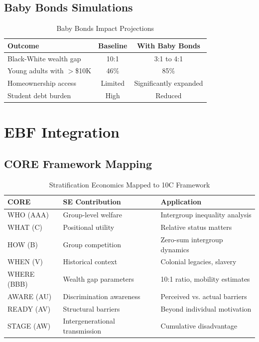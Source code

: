 \subsection{Baby Bonds Simulations}

\begin{table}[htbp]
\centering
\caption{Baby Bonds Impact Projections}
\label{tab:se-baby-bonds}
\begin{tabular}{lcc}
\toprule
\textbf{Outcome} & \textbf{Baseline} & \textbf{With Baby Bonds} \\
\midrule
Black-White wealth gap & 10:1 & 3:1 to 4:1 \\
Young adults with $>$\$10K & 46\% & 85\% \\
Homeownership access & Limited & Significantly expanded \\
Student debt burden & High & Reduced \\
\bottomrule
\end{tabular}
\end{table}

\section{EBF Integration}
\label{sec:se-integration}

\subsection{CORE Framework Mapping}

\begin{table}[htbp]
\centering
\caption{Stratification Economics Mapped to 10C Framework}
\label{tab:se-9c-mapping}
\begin{tabular}{lll}
\toprule
\textbf{CORE} & \textbf{SE Contribution} & \textbf{Application} \\
\midrule
WHO (AAA) & Group-level welfare & Intergroup inequality analysis \\
WHAT (C) & Positional utility & Relative status matters \\
HOW (B) & Group competition & Zero-sum intergroup dynamics \\
WHEN (V) & Historical context & Colonial legacies, slavery \\
WHERE (BBB) & Wealth gap parameters & 10:1 ratio, mobility estimates \\
AWARE (AU) & Discrimination awareness & Perceived vs. actual barriers \\
READY (AV) & Structural barriers & Beyond individual motivation \\
STAGE (AW) & Intergenerational transmission & Cumulative disadvantage \\
\bottomrule
\end{tabular}
\end{table}


